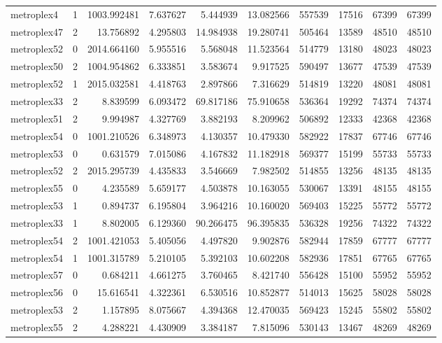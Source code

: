 \begin{longtable}{|l|r|r|r|r|r|r|r|r|r|}
metroplex4 & 1 & 1003.992481 & 7.637627 & 5.444939 & 13.082566 & 557539 & 17516 & 67399 & 67399 \\
metroplex47 & 2 & 13.756892 & 4.295803 & 14.984938 & 19.280741 & 505464 & 13589 & 48510 & 48510 \\
metroplex52 & 0 & 2014.664160 & 5.955516 & 5.568048 & 11.523564 & 514779 & 13180 & 48023 & 48023 \\
metroplex50 & 2 & 1004.954862 & 6.333851 & 3.583674 & 9.917525 & 590497 & 13677 & 47539 & 47539 \\
metroplex52 & 1 & 2015.032581 & 4.418763 & 2.897866 & 7.316629 & 514819 & 13220 & 48081 & 48081 \\
metroplex33 & 2 & 8.839599 & 6.093472 & 69.817186 & 75.910658 & 536364 & 19292 & 74374 & 74374 \\
metroplex51 & 2 & 9.994987 & 4.327769 & 3.882193 & 8.209962 & 506892 & 12333 & 42368 & 42368 \\
metroplex54 & 0 & 1001.210526 & 6.348973 & 4.130357 & 10.479330 & 582922 & 17837 & 67746 & 67746 \\
metroplex53 & 0 & 0.631579 & 7.015086 & 4.167832 & 11.182918 & 569377 & 15199 & 55733 & 55733 \\
metroplex52 & 2 & 2015.295739 & 4.435833 & 3.546669 & 7.982502 & 514855 & 13256 & 48135 & 48135 \\
metroplex55 & 0 & 4.235589 & 5.659177 & 4.503878 & 10.163055 & 530067 & 13391 & 48155 & 48155 \\
metroplex53 & 1 & 0.894737 & 6.195804 & 3.964216 & 10.160020 & 569403 & 15225 & 55772 & 55772 \\
metroplex33 & 1 & 8.802005 & 6.129360 & 90.266475 & 96.395835 & 536328 & 19256 & 74322 & 74322 \\
metroplex54 & 2 & 1001.421053 & 5.405056 & 4.497820 & 9.902876 & 582944 & 17859 & 67777 & 67777 \\
metroplex54 & 1 & 1001.315789 & 5.210105 & 5.392103 & 10.602208 & 582936 & 17851 & 67765 & 67765 \\
metroplex57 & 0 & 0.684211 & 4.661275 & 3.760465 & 8.421740 & 556428 & 15100 & 55952 & 55952 \\
metroplex56 & 0 & 15.616541 & 4.322361 & 6.530516 & 10.852877 & 514013 & 15625 & 58028 & 58028 \\
metroplex53 & 2 & 1.157895 & 8.075667 & 4.394368 & 12.470035 & 569423 & 15245 & 55802 & 55802 \\
metroplex55 & 2 & 4.288221 & 4.430909 & 3.384187 & 7.815096 & 530143 & 13467 & 48269 & 48269 \\

\end{longtable}
